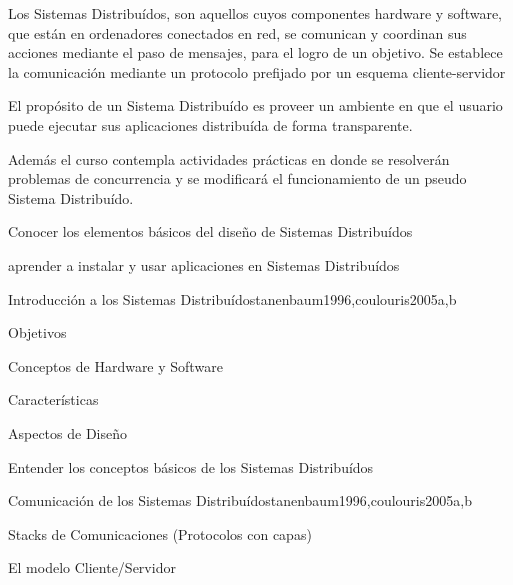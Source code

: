 \begin{syllabus}


\begin{justification}
Los Sistemas Distribuídos, son aquellos cuyos componentes hardware y software, que están en ordenadores conectados en red, se comunican y coordinan sus acciones mediante el paso de mensajes, para el logro de un objetivo. Se establece la comunicación mediante un protocolo prefijado por un esquema cliente-servidor

El propósito de un Sistema Distribuído es proveer un ambiente en que el usuario puede ejecutar sus aplicaciones distribuída de forma transparente.

Además el curso contempla actividades prácticas en donde se resolverán problemas de concurrencia y se modificará el funcionamiento de un pseudo Sistema Distribuído.
\end{justification}

\begin{goals}
\item Conocer los elementos básicos del diseño de Sistemas Distribuídos
\item aprender a instalar y usar aplicaciones en Sistemas Distribuídos
\end{goals}

\begin{outcomes}
\end{outcomes}

\begin{unit}{Introducción a los Sistemas Distribuídos}{tanenbaum1996,coulouris2005}{a,b}
   \begin{topics}
      \item Objetivos
      \item Conceptos de Hardware y Software
      \item Características
      \item Aspectos de Diseño
   \end{topics}

   \begin{unitgoals}
      \item Entender los conceptos básicos de los Sistemas Distribuídos
   \end{unitgoals}
\end{unit}

\begin{unit}{Comunicación de los Sistemas Distribuídos}{tanenbaum1996,coulouris2005}{a,b}
   \begin{topics}
      \item Stacks de Comunicaciones (Protocolos con capas)
      \item El modelo Cliente/Servidor
   \end{topics}


\end{unit}
\end{syllabus}
